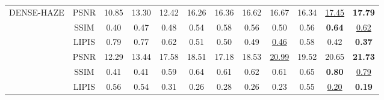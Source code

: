 \documentclass[journal]{IEEEtran}
\begin{document}
\begin{table}
\begin{center}
{\begin{tabular}{ c | c | c | c | c | c | c | c | c | c | c | c }
				\multirow{4}{*}{DENSE-HAZE} & PSNR                    & 10.85                  & 13.30               & 12.42                   & 16.26                & 16.36               & 16.62                      & 16.67                             & 16.34                   & \underline{17.45}                & \textbf{17.79}        \\
				                            & SSIM                    & 0.40                   & 0.47                & 0.48                    & 0.54                 & 0.58                & 0.56                       & 0.50                              & 0.56                    & \textbf{0.64}                    & \underline{0.62}      \\
				                            & LIPIS                   & 0.79                   & 0.77                & 0.62                    & 0.51                 & 0.50                & 0.49                       & \underline{0.46}                  & 0.58                    & 0.42                             & \textbf{0.37}         \\
				\hline

				\multirow{4}{*}{NH-HAZE-20} & PSNR                    & 12.29                  & 13.44               & 17.58                   & 18.51                & 17.18               & 18.53                      & \underline{20.99}                 & 19.52                   & 20.65                            & \textbf{21.73}        \\
				                            & SSIM                    & 0.41                   & 0.41                & 0.59                    & 0.64                 & 0.61                & 0.62                       & 0.61                              & 0.65                    & \textbf{0.80}                    & \underline{0.79}      \\
				                            & LIPIS                   & 0.56                   & 0.54                & 0.31                    & 0.26                 & 0.28                & 0.26                       & 0.23                              & 0.55                    & \underline{0.20}                 & \textbf{0.19}         \\
				\hline


\end{tabular}}
\end{center}
\end{table}
\end{document}
